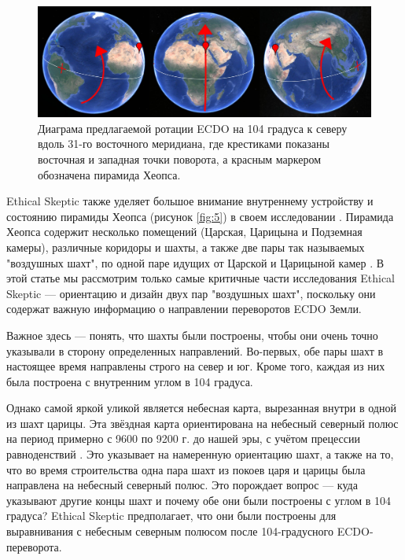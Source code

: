 \documentclass[10pt,twocolumn,letterpaper]{article}
\begin{document}
\begin{figure}[b]
\begin{center}
\includegraphics[width=1\textwidth]{drawing.jpg}
\end{center}
   \caption{Диаграма предлагаемой ротации ECDO на 104 градуса к северу вдоль 31-го восточного меридиана, где крестиками показаны восточная и западная точки поворота, а красным маркером обозначена пирамида Хеопса.}
\label{fig:6}
\end{figure}

Ethical Skeptic также уделяет большое внимание внутреннему устройству и состоянию пирамиды Хеопса (рисунок \ref{fig:5}) в своем исследовании \cite{28}. Пирамида Хеопса содержит несколько помещений (Царская, Царицына и Подземная камеры), различные коридоры и шахты, а также две пары так называемых "воздушных шахт", по одной паре идущих от Царской и Царицыной камер \cite{29,30}. В этой статье мы рассмотрим только самые критичные части исследования Ethical Skeptic — ориентацию и дизайн двух пар "воздушных шахт", поскольку они содержат важную информацию о направлении переворотов ECDO Земли.

Важное здесь — понять, что шахты были построены, чтобы они очень точно указывали в сторону определенных направлений. Во-первых, обе пары шахт в настоящее время направлены строго на север и юг. Кроме того, каждая из них была построена с внутренним углом в 104 градуса.

Однако самой яркой уликой является небесная карта, вырезанная внутри в одной из шахт царицы. Эта звёздная карта ориентирована на небесный северный полюс на период примерно с 9600 по 9200 г. до нашей эры, с учётом прецессии равноденствий \cite{28}. Это указывает на намеренную ориентацию шахт, а также на то, что во время строительства одна пара шахт из покоев царя и царицы была направлена на небесный северный полюс. Это порождает вопрос — куда указывают другие концы шахт и почему обе они были построены с углом в 104 градуса? Ethical Skeptic предполагает, что они были построены для выравнивания с небесным северным полюсом после 104-градусного ECDO-переворота.
\end{document}
